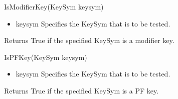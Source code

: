 \documentclass{report}
\begin{document}
\begin{itemize}
\begin{itemize}
\begin{cppcode}
                IsModifierKey(KeySym keysym)
            \end{cppcode}
            \bigbreak \noindent
            \begin{itemize}
                \item keysym Specifies the KeySym that is to be tested.
            \end{itemize}
            Returns True if the specified KeySym is a modifier key.
            \bigbreak \noindent 
            \begin{cppcode}
                IsPFKey(KeySym keysym)
            \end{cppcode}
            \bigbreak \noindent
            \begin{itemize}
                \item keysym Specifies the KeySym that is to be tested.
            \end{itemize}
            Returns True if the specified KeySym is a PF key.
    \end{itemize}


\end{itemize}
\end{document}
